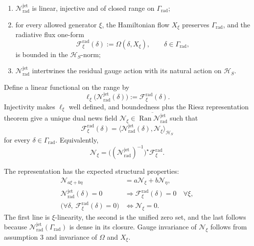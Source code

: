 \documentclass[11pt,a4paper]{article}
\newcommand{\cH}{\mathcal{H}}
\newcommand{\cN}{\mathcal{N}}
\begin{document}
\begin{enumerate}
  \item \(\cN^{\mathrm{jet}}_{\mathrm{rad}}\) is linear, injective and of closed range on \(\Gamma_{\mathrm{rad}}\);
  \item for every allowed generator \(\xi\), the Hamiltonian flow \(X_\xi\) preserves \(\Gamma_{\mathrm{rad}}\), and the radiative flux one-form
    \begin{equation}
      \mathcal F_\xi^{\mathrm{rad}}(\delta)
      :=
      \Omega(\delta,X_\xi),
      \qquad \delta\in\Gamma_{\mathrm{rad}},
    \end{equation}
    is bounded in the \(\cH_S\)-norm;
  \item \(\cN^{\mathrm{jet}}_{\mathrm{rad}}\) intertwines the residual gauge action with its natural action on \(\cH_S\).
\end{enumerate}

Define a linear functional on the range by
\begin{equation}
  \ell_\xi\big(\cN^{\mathrm{jet}}_{\mathrm{rad}}(\delta)\big)
  :=
  \mathcal F_\xi^{\mathrm{rad}}(\delta) .
\end{equation}
Injectivity makes \(\ell_\xi\) well defined, and boundedness plus the Riesz representation theorem give a unique dual news field \(\mathscr N_\xi\in\overline{\operatorname{Ran}\cN^{\mathrm{jet}}_{\mathrm{rad}}}\) such that
\begin{equation}\label{eq:dual-news-flux}
  \boxed{
    \mathcal F_\xi^{\mathrm{rad}}(\delta)
    =
    \big\langle
      \cN^{\mathrm{jet}}_{\mathrm{rad}}(\delta),
      \mathscr N_\xi
    \big\rangle_{\cH_S}
  }
\end{equation}
for every \(\delta\in\Gamma_{\mathrm{rad}}\).  Equivalently,
\begin{equation}\label{eq:dual-news-definition}
  \mathscr N_\xi
  =
  \big((\cN^{\mathrm{jet}}_{\mathrm{rad}})^{-1}\big)^\star
  \mathcal F_\xi^{\mathrm{rad}} .
\end{equation}

The representation has the expected structural properties:
\begin{align}
  \mathscr N_{a\xi+b\eta}
  &=
  a\mathscr N_\xi+b\mathscr N_\eta ,\\
  \cN^{\mathrm{jet}}_{\mathrm{rad}}(\delta)=0
  &\Longrightarrow
  \mathcal F_\xi^{\mathrm{rad}}(\delta)=0\quad\forall\xi,\\
  \big(\forall\delta,\ \mathcal F_\xi^{\mathrm{rad}}(\delta)=0\big)
  &\Longleftrightarrow
  \mathscr N_\xi=0 .
\end{align}
The first line is \(\xi\)-linearity, the second is the unified zero set, and the last follows because \(\cN^{\mathrm{jet}}_{\mathrm{rad}}(\Gamma_{\mathrm{rad}})\) is dense in its closure.  Gauge invariance of \(\mathscr N_\xi\) follows from assumption 3 and invariance of \(\Omega\) and \(X_\xi\).
\end{document}
